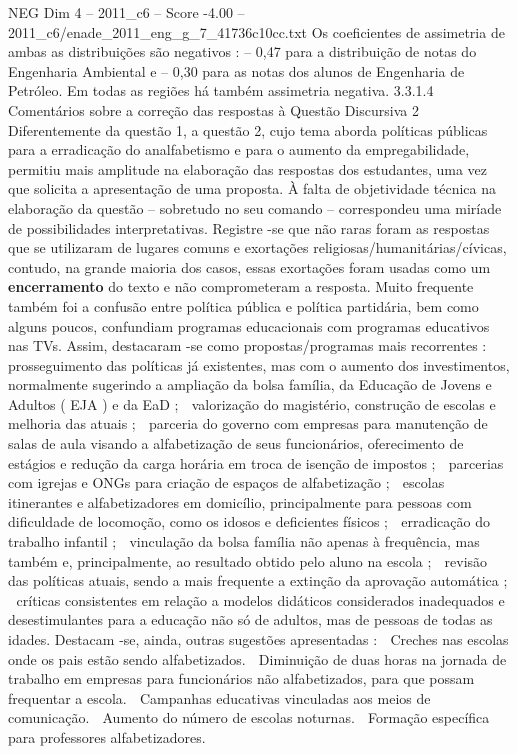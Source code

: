 \begin{textsample}{NEG Dim 4 – 2011\_c6 – Score -4.00 – 2011\_c6/enade\_2011\_eng\_g\_7\_41736c10cc.txt}
Os coeficientes de assimetria de ambas as distribuições são negativos : – 0,47 para a distribuição de notas do Engenharia Ambiental e – 0,30 para as notas dos alunos de Engenharia de Petróleo.
Em todas as regiões há também assimetria negativa. 3.3.1.4 Comentários sobre a correção das respostas à Questão Discursiva 2 Diferentemente da questão 1, a questão 2, cujo tema aborda políticas públicas para a erradicação do analfabetismo e para o aumento da empregabilidade, permitiu mais amplitude na elaboração das respostas dos estudantes, uma vez que solicita a apresentação de uma proposta.
À falta de objetividade técnica na elaboração da questão – sobretudo no seu comando – correspondeu uma miríade de possibilidades interpretativas.
Registre -se que não raras foram as respostas que se utilizaram de lugares comuns e exortações religiosas/humanitárias/cívicas, contudo, na grande maioria dos casos, essas exortações foram usadas como um \textbf{encerramento} do texto e não comprometeram a resposta.
Muito frequente também foi a confusão entre política pública e política partidária, bem como alguns poucos, confundiam programas educacionais com programas educativos nas TVs.
Assim, destacaram -se como propostas/programas mais recorrentes :  prosseguimento das políticas já existentes, mas com o aumento dos investimentos, normalmente sugerindo a ampliação da bolsa família, da Educação de Jovens e Adultos ( EJA ) e da EaD ;  valorização do magistério, construção de escolas e melhoria das atuais ;  parceria do governo com empresas para manutenção de salas de aula visando a alfabetização de seus funcionários, oferecimento de estágios e redução da carga horária em troca de isenção de impostos ;  parcerias com igrejas e ONGs para criação de espaços de alfabetização ;  escolas itinerantes e alfabetizadores em domicílio, principalmente para pessoas com dificuldade de locomoção, como os idosos e deficientes físicos ;  erradicação do trabalho infantil ;  vinculação da bolsa família não apenas à frequência, mas também e, principalmente, ao resultado obtido pelo aluno na escola ;  revisão das políticas atuais, sendo a mais frequente a extinção da aprovação automática ;  críticas consistentes em relação a modelos didáticos considerados inadequados e desestimulantes para a educação não só de adultos, mas de pessoas de todas as idades.
Destacam -se, ainda, outras sugestões apresentadas :  Creches nas escolas onde os pais estão sendo alfabetizados.  Diminuição de duas horas na jornada de trabalho em empresas para funcionários não alfabetizados, para que possam frequentar a escola.  Campanhas educativas vinculadas aos meios de comunicação.  Aumento do número de escolas noturnas.  Formação específica para professores alfabetizadores.

\end{textsample}
